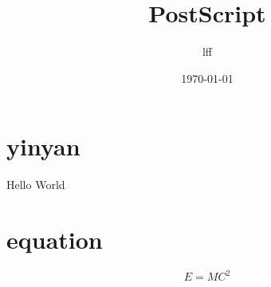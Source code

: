 \documentclass{article}
\title{PostScript }
\author{lff}
\date{\today}
\begin{document}
\section{yinyan}
Hello World

\section{equation}
\[
E=MC^2
\]
\end{document}
